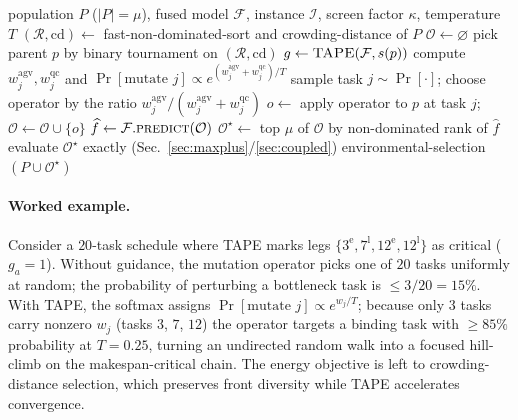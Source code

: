 \documentclass[11pt]{article}
\begin{document}
\begin{algorithm}[t]
\caption{TAPE-guided NSGA-II generation (one step)}
\label{alg:tape}
\begin{algorithmic}[1]
\Require population $P$ ($|P|=\mu$), fused model $\mathcal F$, instance $\mathcal I$, screen factor $\kappa$, temperature $T$
\State $(\mathcal R,\mathrm{cd})\gets$ fast-non-dominated-sort and crowding-distance of $P$
\State $\mathcal O\gets\varnothing$
 
  \State pick parent $p$ by binary tournament on $(\mathcal R,\mathrm{cd})$
  \State $g\gets\textsc{TAPE}(\mathcal F, s(p))$ 
  \State compute $w^{\mathrm{agv}}_j,w^{\mathrm{qc}}_j$ and $\Pr[\text{mutate }j]\propto e^{(w^{\mathrm{agv}}_j+w^{\mathrm{qc}}_j)/T}$
  \State sample task $j\sim\Pr[\cdot]$; choose operator by the ratio $w^{\mathrm{agv}}_j/(w^{\mathrm{agv}}_j{+}w^{\mathrm{qc}}_j)$
  \State $o\gets$ apply operator to $p$ at task $j$; $\mathcal O\gets\mathcal O\cup\{o\}$
\EndFor
\State $\widehat f\gets\mathcal F.\textsc{predict}(\mathcal O)$ 
\State $\mathcal O^\star\gets$ top $\mu$ of $\mathcal O$ by non-dominated rank of $\widehat f$
\State evaluate $\mathcal O^\star$ exactly (Sec.~\ref{sec:maxplus}/\ref{sec:coupled})
\State \Return environmental-selection$(P\cup\mathcal O^\star)$ 
\end{algorithmic}
\end{algorithm}

\paragraph{Worked example.} Consider a $20$-task schedule
where TAPE marks legs $\{3^{\mathrm e},7^{\mathrm l},12^{\mathrm e},12^{\mathrm l}\}$ as
critical ($g_a=1$). Without guidance, the mutation operator picks one of $20$ tasks
uniformly at random; the probability of perturbing a bottleneck task is $\le 3/20=15\%$.
With TAPE, the softmax assigns $\Pr[\text{mutate }j]\propto e^{w_j/T}$; because only $3$
tasks carry nonzero $w_j$ (tasks $3$, $7$, $12$) the operator targets a binding task with
$\ge 85\%$ probability at $T{=}0.25$, turning an undirected random walk into a focused
hill-climb on the makespan-critical chain. The energy objective is left to crowding-distance
selection, which preserves front diversity while TAPE accelerates convergence.
\end{document}
